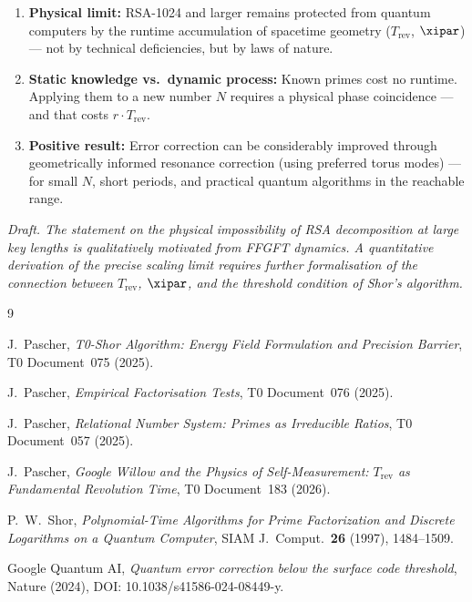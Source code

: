\begin{foundation}
\begin{enumerate}
    \item \textbf{Physical limit:} RSA-1024 and larger remains protected from
    quantum computers by the runtime accumulation of spacetime geometry ($T_\text{rev}$,
    $\xipar$) — not by technical deficiencies, but by laws of nature.

    \item \textbf{Static knowledge vs.\ dynamic process:} Known primes cost no
    runtime. Applying them to a new number $N$ requires a physical phase coincidence —
    and that costs $r \cdot T_\text{rev}$.

    \item \textbf{Positive result:} Error correction can be considerably improved
    through geometrically informed resonance correction (using preferred torus modes)
    — for small $N$, short periods, and practical quantum algorithms in the reachable
    range.
\end{enumerate}
\end{foundation}

\vspace{0.8cm}
\noindent
\textit{Draft. The statement on the physical impossibility of RSA decomposition at
large key lengths is qualitatively motivated from FFGFT dynamics. A quantitative
derivation of the precise scaling limit requires further formalisation of the
connection between $T_\text{rev}$, $\xipar$, and the threshold condition of Shor's
algorithm.}

\begin{thebibliography}{9}

J.~Pascher, \textit{T0-Shor Algorithm: Energy Field Formulation and Precision
Barrier}, T0 Document~075 (2025).

J.~Pascher, \textit{Empirical Factorisation Tests}, T0 Document~076 (2025).

J.~Pascher, \textit{Relational Number System: Primes as Irreducible Ratios},
T0 Document~057 (2025).

J.~Pascher, \textit{Google Willow and the Physics of Self-Measurement:
$T_\text{rev}$ as Fundamental Revolution Time}, T0 Document~183 (2026).

P.~W.~Shor, \textit{Polynomial-Time Algorithms for Prime Factorization and
Discrete Logarithms on a Quantum Computer}, SIAM J.\ Comput.\ \textbf{26}
(1997), 1484--1509.

Google Quantum AI, \textit{Quantum error correction below the surface code
threshold}, Nature (2024), DOI: 10.1038/s41586-024-08449-y.

\end{thebibliography}
